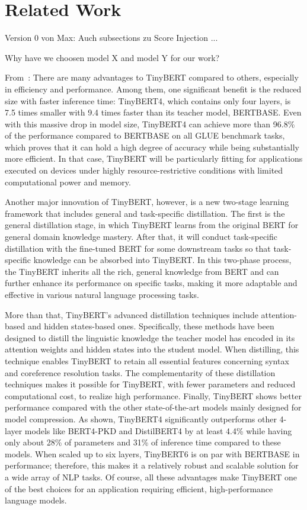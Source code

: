 \section{Related Work}

{\color{red} Version 0 von Max: Auch subsections zu Score Injection ...}

Why have we choosen model X and model Y for our work?

From~\cite{jiao20}: There are many advantages to TinyBERT compared to others, especially in efficiency and performance. Among them, one significant benefit is the reduced size with faster inference time: TinyBERT4, which contains only four layers, is 7.5 times smaller with 9.4 times faster than its teacher model, BERTBASE. Even with this massive drop in model size, TinyBERT4 can achieve more than 96.8\% of the performance compared to BERTBASE on all GLUE benchmark tasks, which proves that it can hold a high degree of accuracy while being substantially more efficient. In that case, TinyBERT will be particularly fitting for applications executed on devices under highly resource-restrictive conditions with limited computational power and memory.

Another major innovation of TinyBERT, however, is a new two-stage learning framework that includes general and task-specific distillation. The first is the general distillation stage, in which TinyBERT learns from the original BERT for general domain knowledge mastery.  After that, it will conduct task-specific distillation with the fine-tuned BERT for some downstream tasks so that task-specific knowledge can be absorbed into TinyBERT. In this two-phase process, the TinyBERT inherits all the rich, general knowledge from BERT and can further enhance its performance on specific tasks, making it more adaptable and effective in various natural language processing tasks.

More than that, TinyBERT's advanced distillation techniques include attention-based and hidden states-based ones. Specifically, these methods have been designed to distill the linguistic knowledge the teacher model has encoded in its attention weights and hidden states into the student model. When distilling, this technique enables TinyBERT to retain all essential features concerning syntax and coreference resolution tasks. The complementarity of these distillation techniques makes it possible for TinyBERT, with fewer parameters and reduced computational cost, to realize high performance. Finally, TinyBERT shows better performance compared with the other state-of-the-art models mainly designed for model compression. As shown, TinyBERT4 significantly outperforms other 4-layer models like BERT4-PKD and DistilBERT4 by at least 4.4\% while having only about 28\% of parameters and 31\% of inference time compared to these models. When scaled up to six layers, TinyBERT6 is on par with BERTBASE in performance; therefore, this makes it a relatively robust and scalable solution for a wide array of NLP tasks. Of course, all these advantages make TinyBERT one of the best choices for an application requiring efficient, high-performance language models.\\


